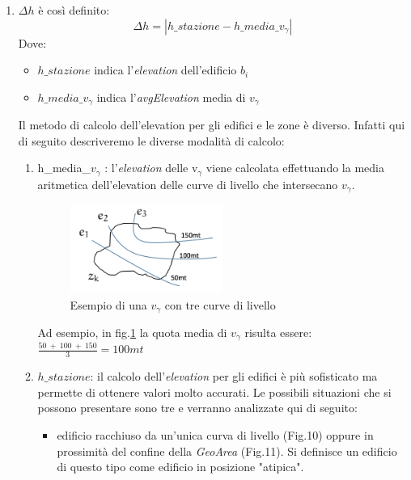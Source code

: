\begin{enumerate}
\item $\Delta{h}$ è così definito:
\begin{equation}
 \Delta{h} =  | h\_stazione - h\_media\_v_\gamma |
 \end{equation}
Dove: 
\begin{itemize}
\item $ h\_stazione$ indica l'\textit{elevation} dell'edificio $b_i$
\item $ h\_media\_v_\gamma$ indica l'\textit{avgElevation} media di $v_\gamma$
\end{itemize}
Il metodo di calcolo dell'elevation per gli edifici e le zone è diverso. Infatti qui di seguito descriveremo le diverse modalità di calcolo:
\begin{enumerate}
\item h\_media\_$v_\gamma$ : l'\textit{elevation} delle v$_\gamma$ viene calcolata effettuando la media aritmetica dell'elevation delle curve di livello che intersecano $v_\gamma$.

\begin{figure}[h]
  \centering
    \includegraphics[width=0.5\textwidth]{img/altezzaZK}
      \caption{Esempio di una $v_\gamma$ con tre curve di livello}
      \label{fig:altezzaZK}
\end{figure}
Ad esempio, in fig.\ref{fig:altezzaZK} la quota media di $v_\gamma$ risulta essere: \newline
$\frac{50\ +\ 100\ +\ 150}{3} = 100 mt$

\item $h\_{stazione}$: il calcolo dell'\textit{elevation} per gli edifici è più sofisticato ma permette di ottenere valori molto accurati.
Le possibili situazioni che si possono presentare sono tre e verranno analizzate qui di seguito:
\begin{itemize}
\item edificio racchiuso da un'unica curva di livello (Fig.10) oppure in prossimità del confine della \textit{GeoArea} (Fig.11). Si definisce un edificio di questo tipo come edificio in posizione "atipica".


\end{itemize}
\end{enumerate}
\end{enumerate}
